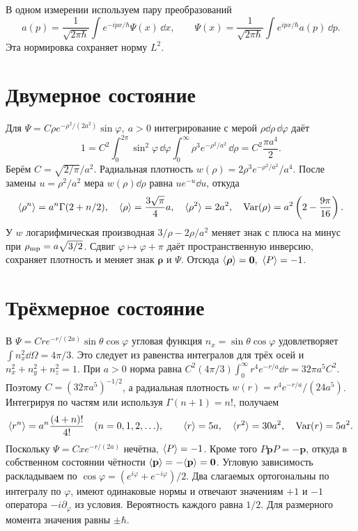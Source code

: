 \documentclass[11pt,a4paper]{article}
\begin{document}

В одном измерении используем пару преобразований
\[
 a(p)=\frac1{\sqrt{2\pi\hbar}}\int e^{-ipx/\hbar}\Psi(x)\,\dd x,\qquad
 \Psi(x)=\frac1{\sqrt{2\pi\hbar}}\int e^{ipx/\hbar}a(p)\,\dd p .
\]
Эта нормировка сохраняет норму \(L^2\).

\section{Двумерное состояние}

Для \(\Psi=C\rho e^{-\rho^2/(2a^2)}\sin\varphi,\ a>0\)
интегрирование с мерой \(\rho\dd\rho\,\dd\varphi\) даёт
\[
 1=C^2\!\int_0^{2\pi}\sin^2\varphi\,\dd\varphi
       \int_0^\infty \rho^3e^{-\rho^2/a^2}\,\dd\rho
   =C^2\frac{\pi a^4}{2}.
\]
Берём \(C=\sqrt{2/\pi}/a^2\).
Радиальная плотность \(w(\rho)=2\rho^3e^{-\rho^2/a^2}/a^4\).
После замены \(u=\rho^2/a^2\) мера \(w(\rho)\dd\rho\) равна
\(u e^{-u}\dd u\), откуда
\[
 \langle \rho^n\rangle=a^n\Gamma(2+n/2),\quad
 \langle \rho\rangle=\frac{3\sqrt\pi}{4}a,\quad
 \langle \rho^2\rangle=2a^2,\quad
 \operatorname{Var}(\rho)=a^2\left(2-\frac{9\pi}{16}\right).
\]
У \(w\) логарифмическая производная \(3/\rho-2\rho/a^2\)
меняет знак с плюса на минус при \(\rho_{\rm mp}=a\sqrt{3/2}\).
Сдвиг \(\varphi\mapsto\varphi+\pi\) даёт пространственную инверсию,
сохраняет плотность и меняет знак \(\boldsymbol\rho\) и \(\Psi\).
Отсюда \(\avg{\boldsymbol\rho}=\mathbf0,\ \avg{P}=-1\).

\section{Трёхмерное состояние}

В \(\Psi=Cre^{-r/(2a)}\sin\theta\cos\varphi\)
угловая функция \(n_x=\sin\theta\cos\varphi\) удовлетворяет
\(\int n_x^2\dd\Omega=4\pi/3\). Это следует из равенства интегралов
для трёх осей и \(n_x^2+n_y^2+n_z^2=1\).
При \(a>0\) норма равна \(C^2(4\pi/3)\int_0^\infty r^4e^{-r/a}\dd r
=32\pi a^5 C^2\). Поэтому \(C=(32\pi a^5)^{-1/2}\), а радиальная
плотность \(w(r)=r^4 e^{-r/a}/(24a^5)\).
Интегрируя по частям или используя \(\Gamma(n+1)=n!\), получаем
\[
 \langle r^n\rangle=a^n\frac{(4+n)!}{4!}\quad(n=0,1,2,\ldots),\qquad
 \langle r\rangle=5a,\quad \langle r^2\rangle=30a^2,\quad \operatorname{Var}(r)=5a^2.
\]
Поскольку \(\Psi=Cx e^{-r/(2a)}\) нечётна, \(\langle P\rangle=-1\).
Кроме того \(P\mathbf pP=-\mathbf p\), откуда в собственном
состоянии чётности \(\langle \mathbf p\rangle=-\langle \mathbf p\rangle=\mathbf0\).
Угловую зависимость раскладываем по
\(\cos\varphi=(e^{i\varphi}+e^{-i\varphi})/2\).
Два слагаемых ортогональны по интегралу по \(\varphi\), имеют
одинаковые нормы и отвечают значениям \(+1\) и \(-1\)
оператора \(-i\partial_\varphi\) из условия. Вероятность каждого
равна \(1/2\). Для размерного момента значения равны \(\pm\hbar\).
\end{document}
